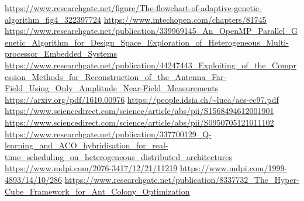 \documentclass[14pt]{article}
\begin{document}
\begin{thebibliography}{99}
		 \url{https://www.researchgate.net/figure/The-flowchart-of-adaptive-genetic-algorithm_fig4_322397724}
		 \url{https://www.intechopen.com/chapters/81745}
		 \url{https://www.researchgate.net/publication/339969145_An_OpenMP_Parallel_Genetic_Algorithm_for_Design_Space_Exploration_of_Heterogeneous_Multi-processor_Embedded_Systems}
		 \url{https://www.researchgate.net/publication/44247443_Exploiting_of_the_Compression_Methods_for_Reconstruction_of_the_Antenna_Far-Field_Using_Only_Amplitude_Near-Field_Measurements}
		 \url{https://arxiv.org/pdf/1610.00976}
		 \url{https://people.idsia.ch/~luca/acs-ec97.pdf}
		 \url{https://www.sciencedirect.com/science/article/abs/pii/S1568494612001901}
		 \url{https://www.sciencedirect.com/science/article/abs/pii/S0950705121011102}
		 \url{https://www.researchgate.net/publication/337700129_Q-learning_and_ACO_hybridisation_for_real-time_scheduling_on_heterogeneous_distributed_architectures}
		 \url{https://www.mdpi.com/2076-3417/12/21/11219}
		 \url{https://www.mdpi.com/1999-4893/14/10/286}
		 \url{https://www.researchgate.net/publication/8337732_The_Hyper-Cube_Framework_for_Ant_Colony_Optimization}
		
	\end{thebibliography}
	
\end{document}
